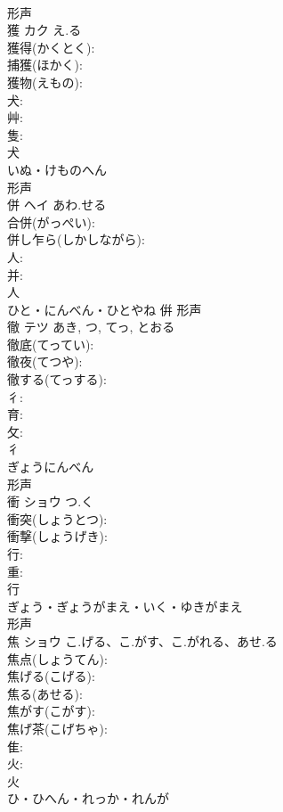 \documentclass[8pt]{extreport}
\begin{document}
\begin{CJK}{UTF8}{min}
\\	形声 
\\	獲	カク	え.る		
\\	獲得(かくとく): 
\\	捕獲(ほかく): 
\\	獲物(えもの): 
\\	犬: 
\\	艸: 
\\	隻: 
\\	犬	
\\	いぬ・けものへん	
\\	形声 
\\	併	ヘイ	あわ.せる		
\\	合併(がっぺい): 
\\	併し乍ら(しかしながら): 
\\	人: 
\\	并: 
\\	人	
\\	ひと・にんべん・ひとやね	倂	形声 
\\	徹	テツ		あき, つ, てっ, とおる	
\\	徹底(てってい): 
\\	徹夜(てつや): 
\\	徹する(てっする): 
\\	彳: 
\\	育: 
\\	攵: 
\\	彳	
\\	ぎょうにんべん	
\\	形声 
\\	衝	ショウ	つ.く		
\\	衝突(しょうとつ): 
\\	衝撃(しょうげき): 
\\	行: 
\\	重: 
\\	行	
\\	ぎょう・ぎょうがまえ・いく・ゆきがまえ	
\\	形声 
\\	焦	ショウ	こ.げる、こ.がす、こ.がれる、あせ.る		
\\	焦点(しょうてん): 
\\	焦げる(こげる): 
\\	焦る(あせる): 
\\	焦がす(こがす): 
\\	焦げ茶(こげちゃ): 
\\	隹: 
\\	火: 
\\	火	
\\	ひ・ひへん・れっか・れんが	

\end{CJK}
\end{document}
